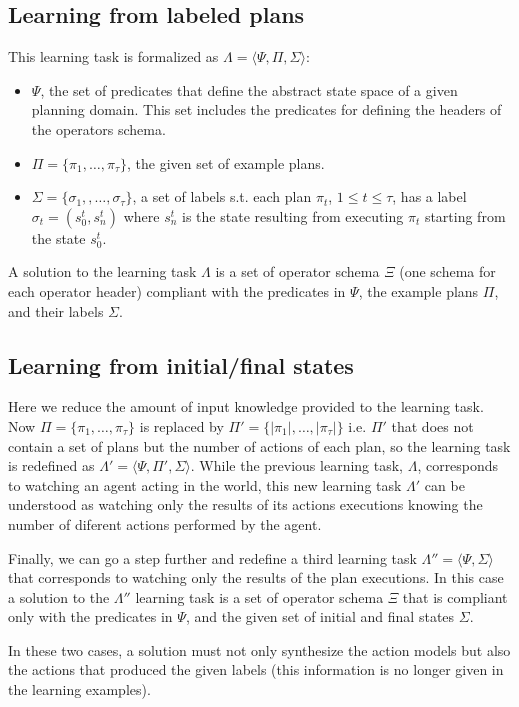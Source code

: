 \documentclass[letterpaper]{article} %
\newcommand{\tup}[1]{{\langle #1 \rangle}}
\begin{document}
\subsection{Learning from labeled plans}
This learning task is formalized as $\Lambda=\tup{\Psi,\Pi,\Sigma}$: 
\begin{itemize}
\item $\Psi$, the set of predicates that define the abstract state space of a given planning domain. This set includes the predicates for defining the headers of the operators schema.
\item $\Pi=\{\pi_1,\ldots,\pi_{\tau}\}$, the given set of example plans.
\item $\Sigma=\{\sigma_1,,\ldots,\sigma_{\tau}\}$, a set of labels s.t. each plan $\pi_t$, {\small $1\leq t\leq \tau$}, has a label $\sigma_t=(s_0^t,s_{n}^t)$ where $s_{n}^t$ is the state resulting from executing $\pi_t$ starting from the state $s_0^t$. 
\end{itemize}

A solution to the learning task $\Lambda$ is a set of operator schema $\Xi$ (one schema for each operator header) compliant with the predicates in $\Psi$, the example plans $\Pi$, and their labels $\Sigma$.

\subsection{Learning from initial/final states}
Here we reduce the amount of input knowledge provided to the learning task. Now $\Pi=\{\pi_1,\ldots,\pi_{\tau}\}$ is replaced by  $\Pi'=\{|\pi_1|,\ldots,|\pi_{\tau}|\}$ i.e. $\Pi'$ that does not contain a set of plans but the number of actions of each plan, so the learning task is redefined as $\Lambda'=\tup{\Psi,\Pi',\Sigma}$. While the previous learning task, $\Lambda$, corresponds to watching an agent acting in the world, this new learning task $\Lambda'$ can be understood as watching only the results of its actions executions knowing the number of diferent actions performed by the agent.

Finally, we can go a step further and redefine a third learning task $\Lambda''=\tup{\Psi,\Sigma}$ that corresponds to watching only the results of the plan executions. In this case a solution to the $\Lambda''$ learning task is a set of operator schema $\Xi$ that is compliant only with the predicates in $\Psi$, and the given set of initial and final states $\Sigma$.

In these two cases, a solution must not only synthesize the action models but also the actions that produced the given labels (this information is no longer given in the learning examples).
\end{document}
